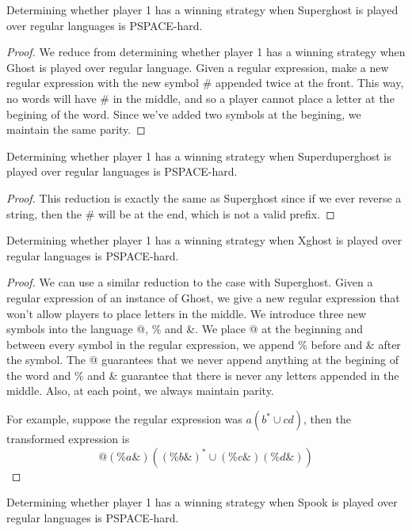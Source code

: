 \documentclass[runningheads,a4paper]{llncs}
\begin{document}
\begin{corollary}
Determining whether player 1 has a winning strategy when Superghost is played over regular languages is PSPACE-hard. 
\end{corollary}

\begin{proof}
We reduce from determining whether player 1 has a winning strategy when Ghost is played over regular language. Given a regular expression, make a new regular expression with the new symbol \# appended twice at the front. This way, no words will have \# in the middle, and so a player cannot place a letter at the begining of the word. Since we've added two symbols at the begining, we maintain the same parity.
\end{proof} 

\begin{corollary}
Determining whether player 1 has a winning strategy when Superduperghost is played over regular languages is PSPACE-hard.
\end{corollary}

\begin{proof}
This reduction is exactly the same as Superghost since if we ever reverse a string, then the \# will be at the end, which is not a valid prefix. 
\end{proof}

\begin{corollary}
Determining whether player 1 has a winning strategy when Xghost is played over regular languages is PSPACE-hard. 
\end{corollary}

\begin{proof}
We can use a similar reduction to the case with Superghost. Given a regular expression of an instance of Ghost, we give a new regular expression that won't allow players to place letters in the middle. We introduce three new symbols into the language @, \% and \&. We place @ at the beginning and between every symbol in the regular expression, we append \% before and \& after the symbol. The @ guarantees that we never append anything at the begining of the word and \% and \& guarantee that there is never any letters appended in the middle. Also, at each point, we always maintain parity.

For example, suppose the regular expression was $a(b^* \cup cd)$, then the transformed expression is
\[ @(\%a\&)((\%b\&)^* \cup (\%c\&)(\%d\&)) \]
\end{proof}

\begin{theorem}
Determining whether player 1 has a winning strategy when Spook is played over regular languages is PSPACE-hard.
\end{theorem}
\end{document}
